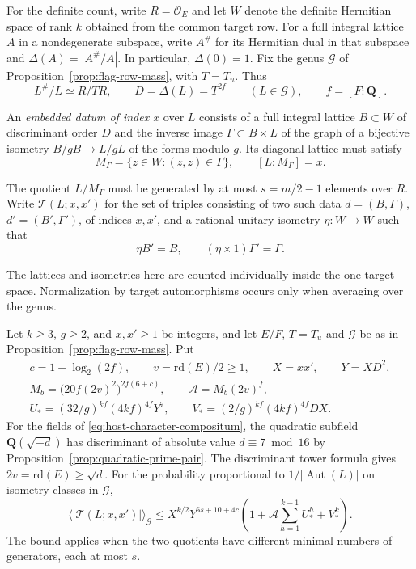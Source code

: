 For the definite count, write \(R=\mathcal O_E\) and
let \(W\) denote the definite Hermitian space of rank \(k\) obtained
from the common target row. For a full integral lattice \(A\) in a
nondegenerate subspace, write \(A^\#\) for its Hermitian dual
in that subspace and \(\Delta(A)=|A^\#/A|\). In particular,
\(\Delta(0)=1\). Fix the genus \(\mathcal G\) of
Proposition~\ref{prop:flag-row-mass}, with \(T=T_u\). Thus
\[
     L^\#/L\simeq R/TR,\qquad D=\Delta(L)=T^{2f}
          \qquad(L\in\mathcal G),\qquad f=[F:\mathbf Q].
\]

An \emph{embedded datum of index \(x\)} over \(L\) consists of
a full integral lattice \(B\subset W\) of discriminant order \(D\)
and the inverse image \(\Gamma\subset B\times L\) of the graph
of a bijective isometry \(B/gB\to L/gL\) of the forms modulo \(g\).
Its diagonal lattice must satisfy
\[
 M_\Gamma=\{z\in W:(z,z)\in\Gamma\},\qquad
 [L:M_\Gamma]=x.
\]

The quotient \(L/M_\Gamma\) must be generated by at most \(s=m/2-1\)
elements over \(R\).
Write \(\mathcal T(L;x,x')\) for the set of triples consisting of
two such data \(d=(B,\Gamma)\), \(d'=(B',\Gamma')\), of indices
\(x,x'\), and a rational unitary isometry \(\eta:W\to W\) such that
\[
          \eta B'=B,\qquad (\eta\times1)\Gamma'=\Gamma .
\]

The lattices and isometries here are counted individually inside
the one target space. Normalization by target automorphisms occurs
only when averaging over the genus.

\begin{auxlemma}
\label{lem:zero-gram-definite-mean}
Let \(k\ge3\), \(g\ge2\), and \(x,x'\ge1\) be integers, and let
\(E/F\), \(T=T_u\) and \(\mathcal G\) be as in
Proposition~\ref{prop:flag-row-mass}. Put
\[
 \begin{gathered}
   c=1+\log_2(2f),\qquad v=\mathrm{rd}(E)/2\ge1,\qquad
   X=xx',\qquad Y=XD^2,\\
   M_b=\bigl(20f(2v)^2\bigr)^{2f(6+c)},\qquad
   \mathcal A=M_b(2v)^f,\\
   U_*=(32/g)^{kf}(4kf)^{4f}Y^7,\qquad
   V_*=(2/g)^{kf}(4kf)^{4f}DX .
 \end{gathered}
\]
For the fields of \eqref{eq:host-character-compositum},
the quadratic subfield \(\mathbf Q(\sqrt{-d})\) has discriminant
of absolute value \(d\equiv7\bmod16\) by
Proposition~\ref{prop:quadratic-prime-pair}. The discriminant tower formula
gives \(2v=\mathrm{rd}(E)\ge\sqrt d\).
For the probability proportional to \(1/|\operatorname{Aut}(L)|\)
on isometry classes in \(\mathcal G\),
\begin{equation}\label{eq:zero-gram-pair-mean}
   \big\langle |\mathcal T(L;x,x')|\big\rangle_{\mathcal G}
   \le X^{k/2}Y^{6s+10+4c}
      \left(1+\mathcal A\sum_{h=1}^{k-1}U_*^h+V_*^k\right).
\end{equation}
The bound applies when the two quotients have different minimal
numbers of generators, each at most \(s\).
\end{auxlemma}

